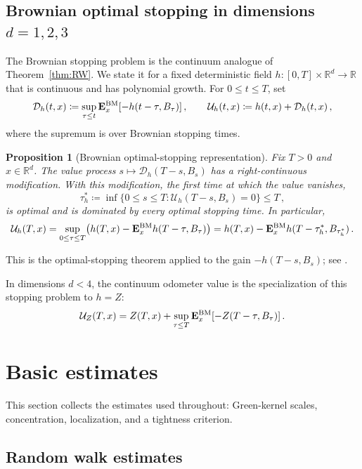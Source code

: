 \documentclass[11pt]{amsart}
\theoremstyle{plain}
\newtheorem{proposition}[theorem]{Proposition}
\theoremstyle{definition}
\newcommand{\R}{\mathbb{R}}
\begin{document}
	\subsection{Brownian optimal stopping in dimensions \texorpdfstring{$d=1,2,3$}{d=1,2,3}}\label{ssec:brownian-stopping}

	The Brownian stopping problem is the continuum analogue of
	Theorem~\ref{thm:RW}. We state it for a fixed deterministic field
	$h:[0,T]\times\R^d\to\R$ that is continuous and has polynomial growth. For
	$0\leq t\leq T$, set
	\[
		\mathcal D_h(t,x)\coloneqq
		\sup_{\tau\leq t}\mathbf E_x^{\rm BM}[-h(t-\tau,B_\tau)]\, ,
		\qquad
		\mathcal U_h(t,x)\coloneqq h(t,x)+\mathcal D_h(t,x)\, ,
	\]
	where the supremum is over Brownian stopping times.

	\begin{proposition}[Brownian optimal-stopping representation]\label{prop:brownian-os}
		Fix $T>0$ and $x\in\R^d$. The value process
		$s\mapsto \mathcal D_h(T-s,B_s)$ has a right-continuous modification. With
		this modification, the first time at which the value vanishes,
		\[
			\tau_h^*\coloneqq \inf\{0\leq s\leq T:\mathcal U_h(T-s,B_s)=0\}\leq T\, ,
		\]
		is optimal and is dominated by every optimal stopping time. In particular,
		\[
			\mathcal U_h(T,x)
			=
			\sup_{0\leq\tau\leq T}\bigl(h(T,x)-\mathbf E_x^{\rm BM} h(T-\tau,B_\tau)\bigr)
			=
			h(T,x)-\mathbf E_x^{\rm BM} h(T-\tau_h^*,B_{\tau_h^*})\, .
		\]
	\end{proposition}
	This is the optimal-stopping theorem applied to the gain $-h(T-s,B_s)$; see \citet[Theorem~2.2]{PeskirShiryaev}.

	In dimensions $d<4$, the continuum odometer value is the specialization of
	this stopping problem to $h=Z$:
	\begin{equation}\label{eq:continuum-membrane-stopping-value}
		\mathcal U_Z(T,x)
		=
		Z(T,x)+\sup_{\tau\leq T}\mathbf E_x^{\rm BM}[-Z(T-\tau,B_\tau)]\, .
	\end{equation}

\section{Basic estimates}\label{sec:estimates}

		This section collects the estimates used throughout: Green-kernel scales,
		concentration, localization, and a tightness criterion.


	\subsection{Random walk estimates}\label{ssec:green-estimates}
\end{document}

